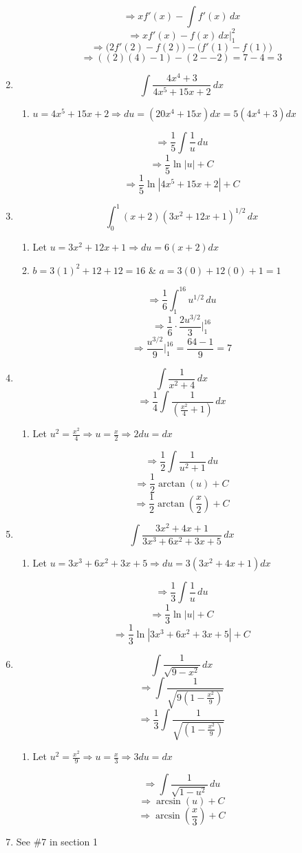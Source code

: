 \documentclass[12pt]{article}
\begin{document}
\begin{enumerate}
$$\Longrightarrow xf'(x)-\int f'(x) \, dx $$
$$ \Longrightarrow xf'(x)-f(x) \, dx \bigg\rvert^{2}_{1} $$
$$ \Longrightarrow \bigg( 2f'(2)-f(2) \bigg) - \bigg(f'(1)-f(1) \bigg) $$
$$ \Longrightarrow ((2)(4)-1)-(2--2)=7-4=3 $$


\item $$\int \frac{4x^4+3}{4x^5+15x+2} \, dx$$
\begin{enumerate}
    \item $u=4x^5+15x+2 \Longrightarrow du = (20x^4+15x)dx= 5(4x^4+3)dx$
\end{enumerate}
$$\Longrightarrow \frac{1}{5} \int \frac{1}{u} \, du$$
$$\Longrightarrow \frac{1}{5} \ln|u|+C$$
$$\Longrightarrow \frac{1}{5} \ln|4x^5+15x+2| + C$$

\item $$\int_{0}^{1} (x+2)(3x^2+12x+1)^{1/2} \, dx$$
\begin{enumerate}
    \item Let $u=3x^2+12x+1 \Longrightarrow du=6(x+2)dx$
    \item $b=3(1)^2+12+12=16$ \& $a=3(0)+12(0)+1=1$
\end{enumerate}
$$\Longrightarrow \frac{1}{6}\int_{1}^{16} u^{1/2} \, du $$
$$\Longrightarrow \frac{1}{6} \cdot \frac{2u^{3/2}}{3} \bigg\rvert^{16}_{1}$$
$$\Longrightarrow\frac{u^{3/2}}{9} \bigg\rvert^{16}_{1} = \frac{64-1}{9}=7$$

\item $$\int \frac{1}{x^2+4} \, dx$$
$$\Longrightarrow \frac{1}{4}\int \frac{1}{(\frac{x^2}{4}+1)} \, dx$$
\begin{enumerate}
    \item Let $u^2=\frac{x^2}{4} \Longrightarrow u=\frac{x}{2} \Longrightarrow 2du=dx$
\end{enumerate}
$$\Longrightarrow \frac{1}{2} \int \frac{1}{u^2+1} \, du$$
$$\Longrightarrow \frac{1}{2}\arctan(u)+C $$
$$\Longrightarrow \frac{1}{2}\arctan(\frac{x}{2})+C $$

\item $$\int \frac{3x^2+4x+1}{3x^3+6x^2+3x+5} \, dx$$
\begin{enumerate}
    \item Let $u=3x^3+6x^2+3x+5 \Longrightarrow du=3(3x^2+4x+1)dx$
\end{enumerate}
$$\Longrightarrow \frac{1}{3} \int \frac{1}{u} \, du$$
$$\Longrightarrow \frac{1}{3} \ln|u|+C$$
$$\Longrightarrow \frac{1}{3} \ln|3x^3+6x^2+3x+5|+C$$

\item $$\int \frac{1}{\sqrt{9-x^2}} \, dx$$
$$\Longrightarrow \int \frac{1}{\sqrt{9(1-\frac{x^2}{9})}}$$
$$\Longrightarrow \frac{1}{3}\int \frac{1}{\sqrt{(1-\frac{x^2}{9})}}$$
\begin{enumerate}
    \item Let $u^2=\frac{x^2}{9} \Longrightarrow u=\frac{x}{3} \Longrightarrow 3du=dx$
\end{enumerate}
$$\Longrightarrow \int \frac{1}{\sqrt{1-u^2}} \,du$$
$$\Longrightarrow \arcsin(u) +C$$
$$\Longrightarrow \arcsin(\frac{x}{3}) +C$$

\item See \#7 in section 1
\end{enumerate}
\end{document}
